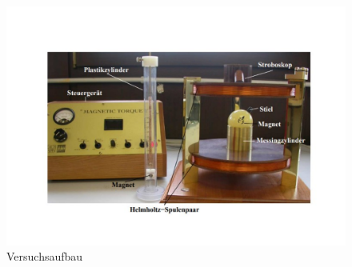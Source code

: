 \begin{figure}
    \centering
    \includegraphics[width = 15cm]{V105Aufbau.pdf}
    \caption{Versuchsaufbau \cite{V105}}
    \label{fig:Aufbau}
\end{figure}